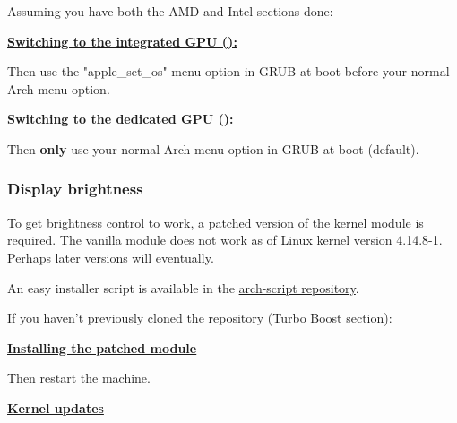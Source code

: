 Assuming you have both the AMD and Intel sections done:

\vspace*{1em}
\textbf{\textcolor{textgrey}{\uline{Switching to the integrated GPU ():}}}


Then use the "apple\_set\_os" menu option in GRUB at boot before your normal Arch menu option.

\vspace*{1em}
\textbf{\textcolor{textgrey}{\uline{Switching to the dedicated GPU ():}}}


Then \textbf{only} use your normal Arch menu option in GRUB at boot (default).

\subsubsection{Display brightness}

To get brightness control to work, a patched version of the  kernel module is required. The vanilla module does \href{https://bugzilla.kernel.org/show_bug.cgi?id=105051#c37}{not work} as of Linux kernel version 4.14.8-1. Perhaps later versions will eventually.

An easy installer script is available in the \href{https://github.com/An7ar35/arch-scripts}{arch-script repository}.

If you haven't previously cloned the repository (Turbo Boost section):


\vspace*{1em}
\textbf{\textcolor{textgrey}{\uline{Installing the patched module}}}


Then restart the machine.

\vspace*{1em}
\textbf{\textcolor{textgrey}{\uline{Kernel updates}}}

